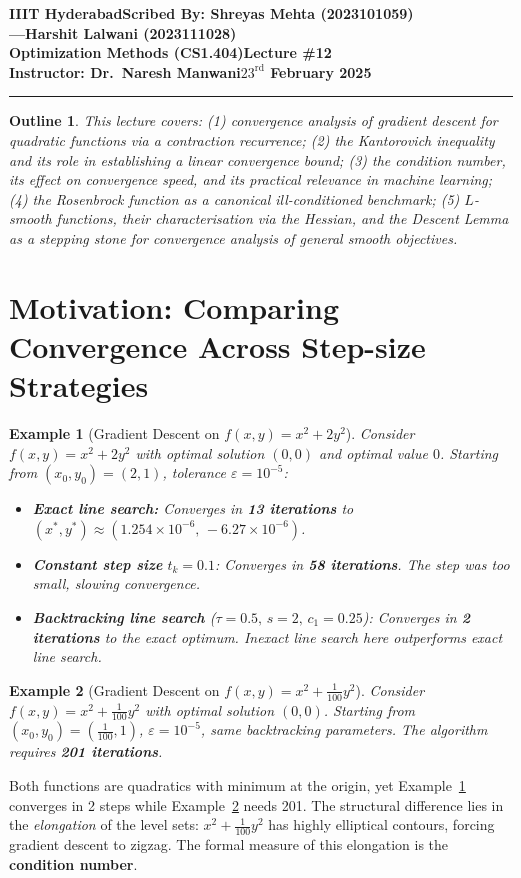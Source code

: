 \documentclass[11pt]{article}
\theoremstyle{definition}
\theoremstyle{plain}
\newtheorem{example}{Example}
\newcommand{\myname}{Scribed By: Shreyas Mehta (2023101059)}
\newcommand{\mynami}{Harshit Lalwani (2023111028)}
\newcommand{\assignment}{Lecture \#12}
\newcommand{\duedate}{$23^{\text{rd}}$ February 2025}
\newtheorem*{thmtype}{Outline}
\newcommand{\statement}{%
This lecture covers: (1) convergence analysis of gradient descent for quadratic functions 
via a contraction recurrence; (2) the Kantorovich inequality and its role in establishing 
a linear convergence bound; (3) the condition number, its effect on convergence speed, 
and its practical relevance in machine learning; (4) the Rosenbrock function as a canonical 
ill-conditioned benchmark; (5) $L$-smooth functions, their characterisation via the Hessian, 
and the Descent Lemma as a stepping stone for convergence analysis of general smooth objectives.
}
\begin{document}
\textbf{IIIT Hyderabad}\hfill\textbf{\myname}\\[0.01in]
\textbf{---}\hfill\textbf{\mynami}\\[0.01in]
\textbf{Optimization Methods (CS1.404)}\hfill\textbf{\assignment}\\[0.01in]
\textbf{Instructor: Dr.\ Naresh Manwani}\hfill\textbf{\duedate}\\
\smallskip\hrule\bigskip

\begin{thmtype}
\statement
\end{thmtype}

\section{Motivation: Comparing Convergence Across Step-size Strategies}

\begin{example}[Gradient Descent on $f(x,y)=x^2+2y^2$]\label{ex:gd_quad1}
Consider $f(x,y)=x^2+2y^2$ with optimal solution $(0,0)$ and optimal value $0$.
Starting from $(x_0,y_0)=(2,1)$, tolerance $\varepsilon=10^{-5}$:
\begin{itemize}
  \item \textbf{Exact line search:} Converges in \textbf{13 iterations} to 
    $(x^*,y^*)\approx(1.254\times10^{-6},\,-6.27\times10^{-6})$.
  \item \textbf{Constant step size} $t_k=0.1$: Converges in \textbf{58 iterations}.
    The step was too small, slowing convergence.
  \item \textbf{Backtracking line search} ($\tau=0.5,\,s=2,\,c_1=0.25$): Converges in
    \textbf{2 iterations} to the exact optimum.
    Inexact line search here outperforms exact line search.
\end{itemize}
\end{example}

\begin{example}[Gradient Descent on $f(x,y)=x^2+\tfrac{1}{100}y^2$]\label{ex:gd_quad2}
Consider $f(x,y)=x^2+\tfrac{1}{100}y^2$ with optimal solution $(0,0)$.
Starting from $(x_0,y_0)=(\tfrac{1}{100},1)$, $\varepsilon=10^{-5}$,
same backtracking parameters. The algorithm requires \textbf{201 iterations}.
\end{example}

Both functions are quadratics with minimum at the origin,
yet Example~\ref{ex:gd_quad1} converges in 2 steps while Example~\ref{ex:gd_quad2}
needs 201. The structural difference lies in the \emph{elongation} of the level sets:
$x^2+\tfrac{1}{100}y^2$ has highly elliptical contours, forcing gradient descent
to zigzag. The formal measure of this elongation is the \textbf{condition number}.
\end{document}
